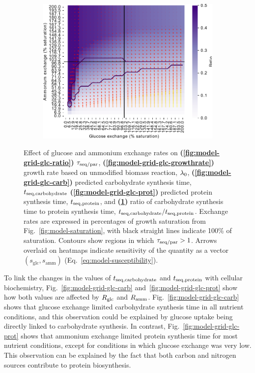 \begin{figure}
  \begin{subfigure}[t]{0.45\textwidth}
  \centering
    \includegraphics[width=\linewidth]{ec_grid_glc_amm_carb_to_prot}
    \caption{
    }
    \label{fig:model-grid-glc-carb-to-prot}
  \end{subfigure}
  \caption[
    Effect of glucose and ammonium exchange rates
  ]{
    Effect of glucose and ammonium exchange rates on \textbf{(\ref{fig:model-grid-glc-ratio})} $\tau_{\mathrm{seq}/\mathrm{par}}$, \textbf{(\ref{fig:model-grid-glc-growthrate})} growth rate based on unmodified biomass reaction, $\lambda_{0}$, \textbf{(\ref{fig:model-grid-glc-carb})} predicted carbohydrate synthesis time, $t_{\mathrm{seq},\mathrm{carbohydrate}}$ \textbf{(\ref{fig:model-grid-glc-prot})} predicted protein synthesis time, $t_{\mathrm{seq},\mathrm{protein}}$, and \textbf{(\ref{fig:model-grid-glc-carb-to-prot})} ratio of carbohydrate synthesis time to protein synthesis time, $t_{\mathrm{seq},\mathrm{carbohydrate}}/t_{\mathrm{seq},\mathrm{protein}}$.
    Exchange rates are expressed in percentages of growth saturation from Fig.\ \ref{fig:model-saturation}, with black straight lines indicate 100\% of saturation.
    Contours show regions in which $\tau_{\mathrm{seq}/\mathrm{par}} > 1$.
    Arrows overlaid on heatmaps indicate sensitivity of the quantity as a vector $(s_{\mathrm{glc}}, s_{\mathrm{amm}})$ (Eq.\ \ref{eq:model-susceptibility}).
  }
  \label{fig:model-grid-glc}
\end{figure}

To link the changes in the values of $t_{\mathrm{seq},\mathrm{carbohydrate}}$ and $t_{\mathrm{seq},\mathrm{protein}}$ with cellular biochemistry, Fig.\ \ref{fig:model-grid-glc-carb} and~\ref{fig:model-grid-glc-prot} show how both values are affected by $R_{\mathrm{glc}}$ and $R_{\mathrm{amm}}$.
Fig.\ \ref{fig:model-grid-glc-carb} shows that glucose exchange limited carbohydrate synthesis time in all nutrient conditions, and this observation could be explained by glucose uptake being directly linked to carbohydrate synthesis.
In contrast, Fig.\ \ref{fig:model-grid-glc-prot} shows that ammonium exchange limited protein synthesis time for most nutrient conditions, except for conditions in which glucose exchange was very low.
This observation can be explained by the fact that both carbon and nitrogen sources contribute to protein biosynthesis.

